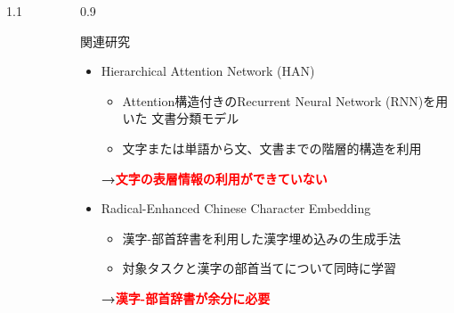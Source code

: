 \documentclass[unicode,10pt]{beamer}
\newlength{\mycolumnwidth}
\newcommand{\arrow}{\textcolor{ttiblue}{\textbf{→}}\hspace{1ex}}
\newcommand{\itemtitle}[1]{#1\\}
\newcommand{\fire}[1]{\textcolor{red}{\textbf{#1}}}
\begin{document}
\begin{frame}[t]
\begin{columns}[onlytextwidth,t]
\begin{column}{1.1\mycolumnwidth}
\begin{figure}
    \end{figure}
  \end{column}
  \begin{column}{0.9\mycolumnwidth}
    \begin{block}{関連研究}
      \begin{itemize}
        \item \itemtitle{Hierarchical Attention Network (HAN) \cite{yang16}}
          \begin{itemize}
            \item Attention構造付きのRecurrent Neural Network (RNN)を用いた
                  文書分類モデル
            \item 文字または単語から文、文書までの階層的構造を利用
          \end{itemize}
          \arrow \fire{文字の表層情報の利用ができていない}
        \item \itemtitle{Radical-Enhanced Chinese Character Embedding
                         \cite{sun14}}
          \begin{itemize}
            \item 漢字-部首辞書を利用した漢字埋め込みの生成手法
            \item 対象タスクと漢字の部首当てについて同時に学習
          \end{itemize}
          \arrow \fire{漢字-部首辞書が余分に必要}
      \end{itemize}
    \end{block}
  \end{column}
\end{columns}



\end{frame}
\end{document}
